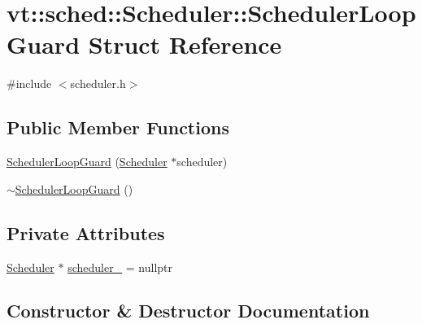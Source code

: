 \hypertarget{structvt_1_1sched_1_1_scheduler_1_1_scheduler_loop_guard}{}\section{vt\+:\+:sched\+:\+:Scheduler\+:\+:Scheduler\+Loop\+Guard Struct Reference}
\label{structvt_1_1sched_1_1_scheduler_1_1_scheduler_loop_guard}


{\ttfamily \#include $<$scheduler.\+h$>$}

\subsection*{Public Member Functions}
\begin{DoxyCompactItemize}
\item 
\hyperlink{structvt_1_1sched_1_1_scheduler_1_1_scheduler_loop_guard_ae27a3a8d8d60384f8d94475926bbd19e}{Scheduler\+Loop\+Guard} (\hyperlink{structvt_1_1sched_1_1_scheduler}{Scheduler} $\ast$scheduler)
\item 
\hyperlink{structvt_1_1sched_1_1_scheduler_1_1_scheduler_loop_guard_a99f568ec1bd01de497ee706c005087c8}{$\sim$\+Scheduler\+Loop\+Guard} ()
\end{DoxyCompactItemize}
\subsection*{Private Attributes}
\begin{DoxyCompactItemize}
\item 
\hyperlink{structvt_1_1sched_1_1_scheduler}{Scheduler} $\ast$ \hyperlink{structvt_1_1sched_1_1_scheduler_1_1_scheduler_loop_guard_a5af77be3e6a48d4d21c6936c8148a35f}{scheduler\+\_\+} = nullptr
\end{DoxyCompactItemize}


\subsection{Constructor \& Destructor Documentation}
\mbox{\label{structvt_1_1sched_1_1_scheduler_1_1_scheduler_loop_guard_ae27a3a8d8d60384f8d94475926bbd19e}} 
